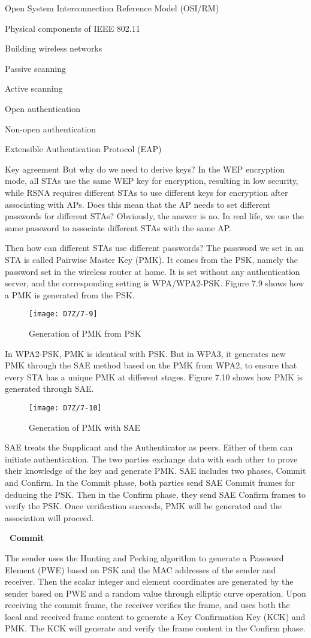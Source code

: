\documentclass[a4paper,12pt]{book}
\begin{document}
\begin{term}{Open System Interconnection Reference Model (OSI/RM)}
\begin{term}{Physical components of IEEE 802.11}
\begin{term}{Building wireless networks}
\begin{term}{Passive scanning}
\begin{term}{Active scanning}
\begin{term}{Open authentication}
\begin{term}{Non-open authentication}
\begin{term}{Extensible Authentication Protocol (EAP)}
\begin{term}{Key agreement}
    \parskip 6pt
    But why do we need to derive keys? In the WEP encryption mode, all STAs use the same WEP key for encryption, resulting in low security, while RSNA requires different STAs to use different keys for encryption after associating with APs. Does this mean that the AP needs to set different passwords for different STAs? Obviously, the answer is no. In real life, we use the same password to associate different STAs with the same AP.
    
    Then how can different STAs use different passwords? The password we set in an STA is called Pairwise Master Key (PMK). It comes from the PSK, namely the password set in the wireless router at home. It is set without any authentication server, and the corresponding setting is WPA/WPA2-PSK. Figure 7.9 shows how a PMK is generated from the PSK.

    \begin{figure}[!h]
        \centering
        \texttt{[image: D7Z/7-9]}
        \caption{Generation of PMK from PSK}
    \end{figure}
    
    In WPA2-PSK, PMK is identical with PSK. But in WPA3, it generates new PMK through the SAE method based on the PMK from WPA2, to ensure that every STA has a unique PMK at different stages. Figure 7.10 shows how PMK is generated through SAE.

    \begin{figure}[!h]
        \centering
        \texttt{[image: D7Z/7-10]}
        \caption{Generation of PMK with SAE}
    \end{figure}

    SAE treats the Supplicant and the Authenticator as peers. Either of them can initiate authentication. The two parties exchange data with each other to prove their knowledge of the key and generate PMK. SAE includes two phases, Commit and Confirm. In the Commit phase, both parties send SAE Commit frames for deducing the PSK. Then in the Confirm phase, they send SAE Confirm frames to verify the PSK. Once verification succeeds, PMK will be generated and the association will proceed.

    \textbf{\textbullet\ Commit}
        
    The sender uses the Hunting and Pecking algorithm to generate a Password Element (PWE) based on PSK and the MAC addresses of the sender and receiver. Then the scalar integer and element coordinates are generated by the sender based on PWE and a random value through elliptic curve operation. Upon receiving the commit frame, the receiver verifies the frame, and uses both the local and received frame content to generate a Key Confirmation Key (KCK) and PMK. The KCK will generate and verify the frame content in the Confirm phase.


\end{term}
\end{term}
\end{term}
\end{term}
\end{term}
\end{term}
\end{term}
\end{term}
\end{term}
\end{document}
